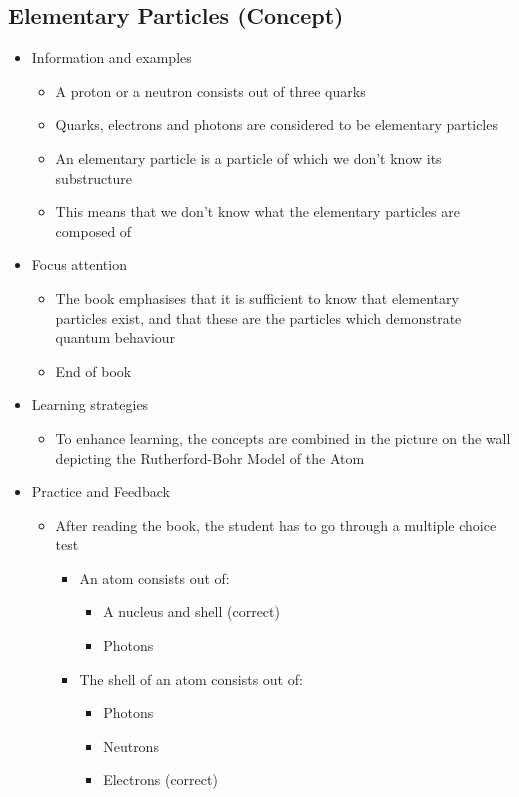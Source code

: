 \documentclass[11pt,twoside]{report} %
\begin{document}
\subsection{Elementary Particles (Concept)}
\begin{itemize}
	\item Information and examples
	\begin{itemize}
		\item A proton or a neutron consists out of three quarks
		\item Quarks, electrons and photons are considered to be elementary particles
		\item An elementary particle is a particle of which we don’t know its substructure
		\item This means that we don’t know what the elementary particles are composed of
	\end{itemize}
	\item Focus attention
	\begin{itemize}
		\item The book emphasises that it is sufficient to know that elementary particles exist, and that these are the particles which demonstrate quantum behaviour
		\item {End of book}
	\end{itemize}
	\item Learning strategies
	\begin{itemize}
		\item To enhance learning, the concepts are combined in the picture on the wall depicting the Rutherford-Bohr Model of the Atom
	\end{itemize}
	\item Practice and Feedback
	\begin{itemize}
		\item After reading the book, the student has to go through a multiple choice test
		\begin{itemize}
			\item An atom consists out of:
			\begin{itemize}
				\item A nucleus and shell (correct)
				\item Photons
			\end{itemize}
			\item The shell of an atom consists out of:
			\begin{itemize}
				\item Photons
				\item Neutrons
				\item Electrons (correct)

\end{itemize}
\end{itemize}
\end{itemize}
\end{itemize}
\end{document}
